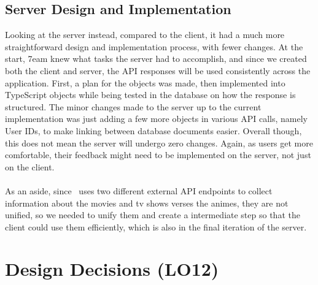 \documentclass{article}
\begin{document}
\subsection{Server Design and Implementation}
Looking at the server instead, compared to the client, it had a much more straightforward design and implementation process, with fewer changes. At the start, 7eam knew what tasks the server had to accomplish, and since we created both the client and server, the API responses will be used consistently across the application. First, a plan for the objects was made, then implemented into TypeScript objects while being tested in the database on how the response is structured. The minor changes made to the server up to the current implementation was just adding a few more objects in various API calls, namely User IDs, to make linking between database documents easier. Overall though, this does not mean the server will undergo zero changes. Again, as users get more comfortable, their feedback might need to be implemented on the server, not just on the client.
\\~\\ As an aside, since \progname ~uses two different external API endpoints to collect information about the movies and tv shows verses the animes, they are not unified, so we needed to unify them and create a intermediate step so that the client could use them efficiently, which is also in the final iteration of the server.

\section{Design Decisions (LO12)}
\end{document}
